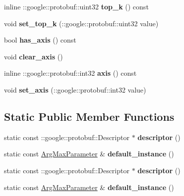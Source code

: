 \begin{DoxyCompactItemize}
\mbox{\label{classcaffe_1_1_arg_max_parameter_aed4ee541bb9b371be3e142e578fd1e26}} 
inline \+::google\+::protobuf\+::uint32 {\bfseries top\+\_\+k} () const
\item 
\mbox{\label{classcaffe_1_1_arg_max_parameter_ad90652d28110a1e5d8d4e5409b49d634}} 
void {\bfseries set\+\_\+top\+\_\+k} (\+::google\+::protobuf\+::uint32 value)
\item 
\mbox{\label{classcaffe_1_1_arg_max_parameter_a92cdc8b454444abdb76ecf1b72818d8b}} 
bool {\bfseries has\+\_\+axis} () const
\item 
\mbox{\label{classcaffe_1_1_arg_max_parameter_ab908bcd39893275fe8f342c015d11823}} 
void {\bfseries clear\+\_\+axis} ()
\item 
\mbox{\label{classcaffe_1_1_arg_max_parameter_aaf424e4ccec506ad6a20997d2abe1001}} 
inline \+::google\+::protobuf\+::int32 {\bfseries axis} () const
\item 
\mbox{\label{classcaffe_1_1_arg_max_parameter_a52ffce5d27f70edabf979332ff8d1c5d}} 
void {\bfseries set\+\_\+axis} (\+::google\+::protobuf\+::int32 value)
\end{DoxyCompactItemize}
\subsection*{Static Public Member Functions}
\begin{DoxyCompactItemize}
\item 
\mbox{\label{classcaffe_1_1_arg_max_parameter_a340a94ba017de87d9e26cdc145895c7c}} 
static const \+::google\+::protobuf\+::\+Descriptor $\ast$ {\bfseries descriptor} ()
\item 
\mbox{\label{classcaffe_1_1_arg_max_parameter_ad47b6b5a32211580b2f7f78744503a7b}} 
static const \mbox{\hyperlink{classcaffe_1_1_arg_max_parameter}{Arg\+Max\+Parameter}} \& {\bfseries default\+\_\+instance} ()
\item 
\mbox{\label{classcaffe_1_1_arg_max_parameter_adc7d9fe56917880338d48e4808c5f6ea}} 
static const \+::google\+::protobuf\+::\+Descriptor $\ast$ {\bfseries descriptor} ()
\item 
\mbox{\label{classcaffe_1_1_arg_max_parameter_afad55d5797c1040ec19e4936600e0352}} 
static const \mbox{\hyperlink{classcaffe_1_1_arg_max_parameter}{Arg\+Max\+Parameter}} \& {\bfseries default\+\_\+instance} ()
\end{DoxyCompactItemize}
